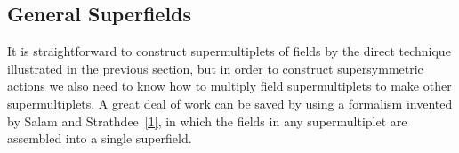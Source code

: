 
\subsection{General Superfields}

\providecommand{\gradedbracket}[2]{\left[#1,#2\right\}}
\providecommand{\SuperQ}{\mathcal{Q}}

It is straightforward to construct supermultiplets of fields by the direct
technique illustrated in the previous section, but in order to construct
supersymmetric actions we also need to know how to multiply field
supermultiplets to make other supermultiplets. A great deal of work can be
saved by using a formalism invented by Salam and
Strathdee~\hyperref[ch26-ref-1]{[1]}, in which the fields in any
supermultiplet are assembled into a single superfield.

